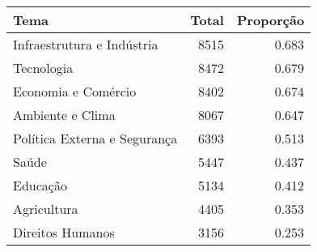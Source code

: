 \begin{tabular}{lrr}
\toprule
Tema & Total & Proporção \\
\midrule
Infraestrutura e Indústria & 8515 & 0.683 \\
Tecnologia & 8472 & 0.679 \\
Economia e Comércio & 8402 & 0.674 \\
Ambiente e Clima & 8067 & 0.647 \\
Política Externa e Segurança & 6393 & 0.513 \\
Saúde & 5447 & 0.437 \\
Educação & 5134 & 0.412 \\
Agricultura & 4405 & 0.353 \\
Direitos Humanos & 3156 & 0.253 \\
\bottomrule
\end{tabular}
